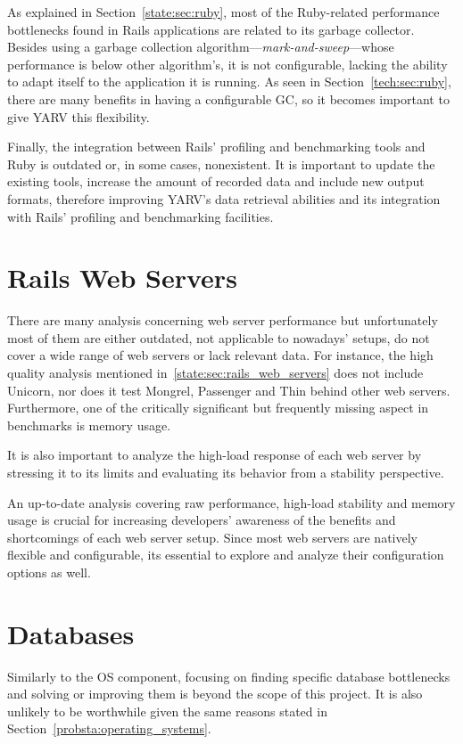 As explained in Section~\ref{state:sec:ruby}, most of the Ruby-related performance bottlenecks found in Rails applications are related to its garbage collector. Besides using a garbage collection algorithm---\textit{mark-and-sweep}---whose performance is below other algorithm's, it is not configurable, lacking the ability to adapt itself to the application it is running. As seen in Section~\ref{tech:sec:ruby}, there are many benefits in having a configurable GC, so it becomes important to give YARV this flexibility. 

Finally, the integration between Rails' profiling and benchmarking tools and Ruby is outdated or, in some cases, nonexistent. It is important to update the existing tools, increase the amount of recorded data and include new output formats, therefore improving YARV's data retrieval abilities and its integration with Rails' profiling and benchmarking facilities.

\section{Rails Web Servers}
There are many analysis concerning web server performance but unfortunately most of them are either outdated, not applicable to nowadays' setups, do not cover a wide range of web servers or lack relevant data. For instance, the high quality analysis mentioned in~\ref{state:sec:rails_web_servers} does not include Unicorn, nor does it test Mongrel, Passenger and Thin behind other web servers. Furthermore, one of the critically significant but frequently missing aspect in benchmarks is memory usage.

It is also important to analyze the high-load response of each web server by stressing it to its limits and evaluating its behavior from a stability perspective. 

An up-to-date analysis covering raw performance, high-load stability and memory usage is crucial for increasing developers' awareness of the benefits and shortcomings of each web server setup. Since most web servers are natively flexible and configurable, its essential to explore and analyze their configuration options as well.

\section{Databases}
Similarly to the OS component, focusing on finding specific database bottlenecks and solving or improving them is beyond the scope of this project. It is also unlikely to be worthwhile given the same reasons stated in Section~\ref{probsta:operating_systems}.

